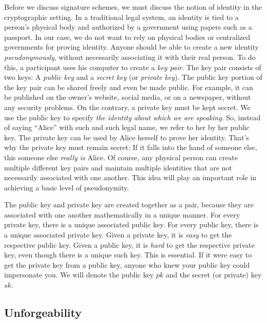 Before we discuss signature schemes, we must discuss the notion of identity in the cryptographic
setting. In a traditional legal system, an identity is tied to a person's physical body
and authorized by a government using papers such as a passport. In our case, we do not want
to rely on physical bodies or centralized governments for proving identity. Anyone should be
able to create a new identity \emph{pseudonymously}, without necessarily associating it with
their real person. To do this, a participant uses his computer to create a \emph{key pair}.
The key pair consists of two keys: A \emph{public key} and a \emph{secret key}
(or \emph{private key}). The public key portion of the key pair can be shared freely and even
be made public. For example, it can be published on the owner's website, social media, or on
a newspaper, without any security problems. On the contrary, a private key must be kept secret.
We use the public key to specify \emph{the identity about which we are speaking}. So, instead
of saying ``Alice'' with such and such legal name, we refer to her by her public
key. The private key can be used by Alice herself to prove her identity. That's why the
private key must remain secret: If it falls into the hand of someone else, this someone
else \emph{really is} Alice. Of course, any physical person can create multiple different
key pairs and maintain multiple identities that are not necessarily associated with one
another. This idea will play an important role in achieving a basic level of pseudonymity.

The public key and private key are created together as a pair, because they are associated
with one another mathematically in a unique manner. For every private key, there is a unique
associated public key. For every public key, there is a unique associated private key.
Given a private key, it is \emph{easy} to get the respective public key. Given a public
key, it is \emph{hard} to get the respective private key, even though there is a unique
such key. This is essential. If it were easy to get the private key from a public key,
anyone who knew your public key could impersonate you. We will denote the public key
$pk$
and the secret (or private) key
$sk$.

\subsection*{Unforgeability}

